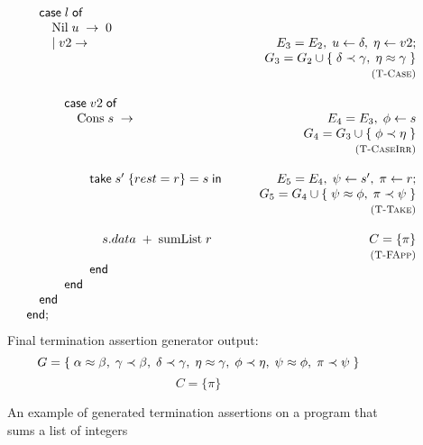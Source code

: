 \begin{figure}
\[\begin{array}{lr}
            \hspace{2em}    \textsf{case}\; l\; \textsf{of} \\
            \hspace{3em}        \text{Nil}\; u\; \rightarrow\; 0 \\
            \hspace{3em}    |\; v2 \rightarrow 
                & E_3 = E_2,\; u \leftarrow \delta,\; \eta \leftarrow v2; \\
                & G_3 = G_2 \cup \{\; \delta \prec \gamma,\; \eta \approx \gamma\; \} \\
                & \textsc{\footnotesize (T-Case)}\\
                \\
            \hspace{4em}    \textsf{case}\; v2\; \textsf{of} \\
            \hspace{5em}    \text{Cons}\; s\; \rightarrow 
                & E_4 = E_3,\; \phi \leftarrow s \\
                & G_4 = G_3 \cup \{\; \phi \prec \eta\; \} \\
                & \textsc{\footnotesize (T-CaseIrr)} \\
                \\
            \hspace{6em}    \textsf{take}\; s'\; \{ rest = r \} = s\; \textsf{in} \hspace{2em}
                & E_5 = E_4,\; \psi \leftarrow s',\; \pi \leftarrow r;  \\
                & G_5 = G_4 \cup \{\; \psi \approx \phi,\; \pi \prec \psi\; \} \\
                & \textsc{\footnotesize (T-Take)} \\
                \\
            \hspace{7em}        s.data\; +\; \text{sumList}\; r
                & C = \{\pi\}\\
                & \textsc{\footnotesize (T-FApp)}\\
            \hspace{6em}    \textsf{end} \\
            \hspace{4em}    \textsf{end} \\
            \hspace{2em}    \textsf{end} \\
            \hspace{1em}    \textsf{end};
        \end{array}
    \]
    Final termination assertion generator output:
    \[
        G = \{\;
            \alpha \approx \beta,\;
            \gamma \prec \beta,\;
            \delta \prec \gamma,\;
            \eta \approx \gamma,\;
            \phi \prec \eta,\;
            \psi \approx \phi,\;
            \pi \prec \psi\;
        \}
    \]
    \[
        C = \{\pi\}    
    \]

    
    \caption{An example of generated termination assertions on a program
             that sums a list of integers}
    \label{fig:exampletermination}
\end{figure}

